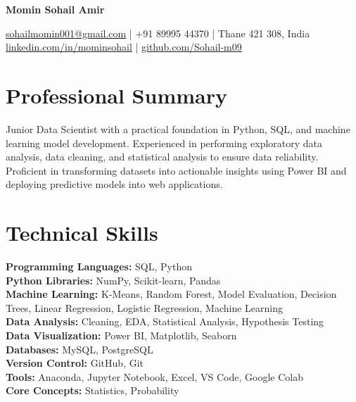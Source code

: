 \documentclass[10pt,a4paper]{article}
\begin{document}

\begin{center}

{\LARGE \textbf{Momin Sohail Amir}}

\vspace{4pt}

\href{mailto:sohailmomin001@gmail.com}{sohailmomin001@gmail.com} \quad | \quad +91 89995 44370 \quad | \quad Thane 421 308, India \\ \href{https://linkedin.com/in/mominsohail}{linkedin.com/in/mominsohail} \quad | \quad \href{https://github.com/Sohail-m09}{github.com/Sohail-m09}

\end{center}

\section*{Professional Summary}

Junior Data Scientist with a practical foundation in Python, SQL, and machine learning model development. Experienced in performing exploratory data analysis, data cleaning, and statistical analysis to ensure data reliability. Proficient in transforming datasets into actionable insights using Power BI and deploying predictive models into web applications.

\section*{Technical Skills}

\textbf{Programming Languages:} SQL, Python\\
\textbf{Python Libraries:} NumPy, Scikit-learn, Pandas\\
\textbf{Machine Learning:} K-Means, Random Forest, Model Evaluation, Decision Trees, Linear Regression, Logistic Regression, Machine Learning\\
\textbf{Data Analysis:} Cleaning, EDA, Statistical Analysis, Hypothesis Testing\\
\textbf{Data Visualization:} Power BI, Matplotlib, Seaborn\\
\textbf{Databases:} MySQL, PostgreSQL\\
\textbf{Version Control:} GitHub, Git\\
\textbf{Tools:} Anaconda, Jupyter Notebook, Excel, VS Code, Google Colab\\
\textbf{Core Concepts:} Statistics, Probability
\end{document}
